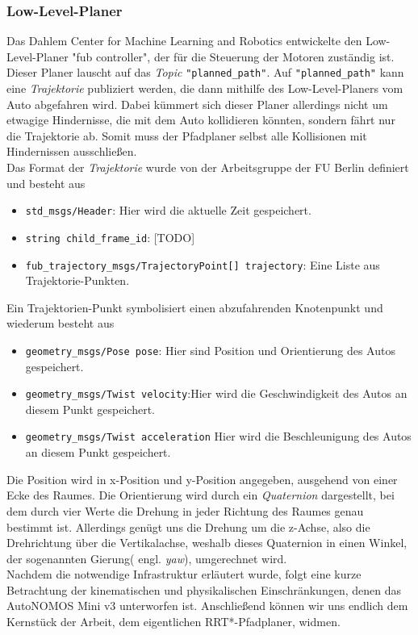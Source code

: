 \subsubsection{Low-Level-Planer}
Das Dahlem Center for Machine Learning and Robotics entwickelte den Low-Level-Planer "fub controller", der für die Steuerung der Motoren zuständig ist.
Dieser Planer lauscht auf das \textit{Topic} \verb|"planned_path"|. Auf \verb|"planned_path"| kann eine \textit{Trajektorie} publiziert werden, die dann mithilfe des Low-Level-Planers vom Auto abgefahren wird. Dabei kümmert sich dieser Planer allerdings nicht um etwagige Hindernisse, die mit dem Auto kollidieren könnten, sondern fährt nur die Trajektorie ab. Somit muss der Pfadplaner selbst alle Kollisionen mit Hindernissen ausschließen. \\
Das Format der \textit{Trajektorie} wurde von der Arbeitsgruppe der FU Berlin definiert und besteht aus
\begin{itemize}
\item \verb|std_msgs/Header|: Hier wird die aktuelle Zeit gespeichert.
\item \verb|string child_frame_id|: [TODO]
\item \verb|fub_trajectory_msgs/TrajectoryPoint[] trajectory|: Eine Liste aus Trajektorie-Punkten.
\end{itemize}
Ein Trajektorien-Punkt symbolisiert einen abzufahrenden Knotenpunkt und wiederum besteht aus
\begin{itemize}
\item \verb|geometry_msgs/Pose pose|: Hier sind Position und Orientierung des Autos gespeichert.
\item \verb|geometry_msgs/Twist velocity|:Hier wird die Geschwindigkeit des Autos an diesem Punkt gespeichert.
\item \verb|geometry_msgs/Twist acceleration| Hier wird die Beschleunigung des Autos an diesem Punkt gespeichert.
\end{itemize}
Die Position wird in x-Position und y-Position angegeben, ausgehend von einer Ecke des Raumes. Die Orientierung wird durch ein \textit{Quaternion} dargestellt, bei dem durch vier Werte die Drehung in jeder Richtung des Raumes genau bestimmt ist. Allerdings genügt uns die Drehung um die z-Achse, also die Drehrichtung über die Vertikalachse, weshalb dieses Quaternion in einen Winkel, der sogenannten Gierung( engl. \textit{yaw}), umgerechnet wird.
\\
Nachdem die notwendige Infrastruktur erläutert wurde, folgt eine kurze Betrachtung der kinematischen und physikalischen Einschränkungen, denen das AutoNOMOS Mini v3 unterworfen ist. Anschließend können wir uns endlich dem Kernstück der Arbeit, dem eigentlichen RRT*-Pfadplaner, widmen.

